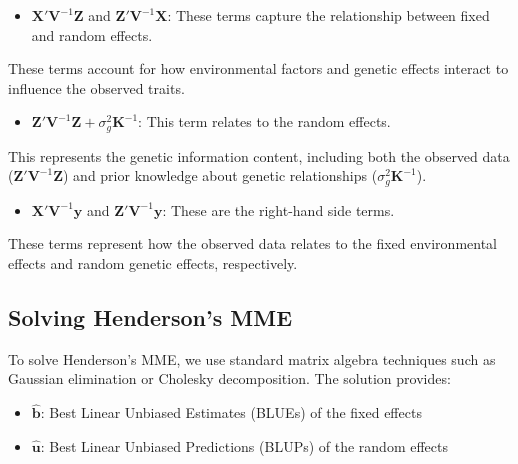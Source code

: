 \documentclass[12pt,a4paper]{article}
\begin{document}
\begin{itemize}
    \item $\mathbf{X'} \mathbf{V}^{-1} \mathbf{Z}$ and $\mathbf{Z'} \mathbf{V}^{-1} \mathbf{X}$: These terms capture the relationship between fixed and random effects.
\end{itemize}
    \begin{tcolorbox}[colback=green!5!white,colframe=uqpurple!75!black,title=Biological Interpretation]
    These terms account for how environmental factors and genetic effects interact to influence the observed traits.
    \end{tcolorbox}

\begin{itemize}
    \item $\mathbf{Z'} \mathbf{V}^{-1} \mathbf{Z} + \sigma^2_g \mathbf{K}^{-1}$: This term relates to the random effects.
\end{itemize}
    \begin{tcolorbox}[colback=green!5!white,colframe=uqpurple!75!black,title=Biological Interpretation]
    This represents the genetic information content, including both the observed data ($\mathbf{Z'} \mathbf{V}^{-1} \mathbf{Z}$) and prior knowledge about genetic relationships ($\sigma^2_g \mathbf{K}^{-1}$).
    \end{tcolorbox}

\begin{itemize}
    \item $\mathbf{X'} \mathbf{V}^{-1} \mathbf{y}$ and $\mathbf{Z'} \mathbf{V}^{-1} \mathbf{y}$: These are the right-hand side terms.
\end{itemize}
    \begin{tcolorbox}[colback=green!5!white,colframe=uqpurple!75!black,title=Biological Interpretation]
    These terms represent how the observed data relates to the fixed environmental effects and random genetic effects, respectively.
    \end{tcolorbox}

\subsection{Solving Henderson's MME}

To solve Henderson's MME, we use standard matrix algebra techniques such as Gaussian elimination or Cholesky decomposition. The solution provides:

\begin{itemize}
    \item $\hat{\mathbf{b}}$: Best Linear Unbiased Estimates (BLUEs) of the fixed effects
    \item $\hat{\mathbf{u}}$: Best Linear Unbiased Predictions (BLUPs) of the random effects
\end{itemize}
\end{document}
